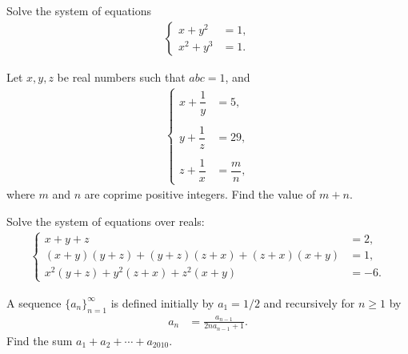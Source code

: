 \begin{question}[name={2008 Ecuador TST}]
    Solve the system of equations
    \begin{align*}
        \begin{cases}
            x+y^2 &= 1,\\ x^2+y^3 &= 1.
        \end{cases}
    \end{align*}
\end{question}



\begin{question}[name={2009 Ecuador TST}]
    Let $x,y,z$ be real numbers such that $abc=1$, and
    \begin{align*}
        \begin{cases}
            x+\dfrac{1}{y} &= 5,\\ & \\ y+\dfrac{1}{z} &= 29,\\ & \\ z+\dfrac{1}{x} &= \dfrac{m}{n},
        \end{cases}
    \end{align*}
    where $m$ and $n$ are coprime positive integers. Find the value of $m+n$.
\end{question}


\begin{question}[name={2009 Ecuador TST}]
    Solve the system of equations over reals:
    \begin{align*}
        \begin{cases}
            x+y+z &= 2,\\
            (x+y)(y+z) + (y+z)(z+x) + (z+x)(x+y) &= 1,\\
            x^2(y+z) + y^2(z+x) + z^2(x+y) &= -6.
        \end{cases}
    \end{align*}
\end{question}



\begin{question}[name={2010 Ecuador TST}]
    A sequence $\{a_n\}_{n=1}^{\infty}$ is defined initially by $a_1=1/2$ and recursively for $n\geq 1$ by
    \begin{align*}
        a_n &= \frac{a_{n-1}}{2na_{n-1}+1}.
    \end{align*}
    Find the sum $a_1+a_2+\cdots+a_{2010}$.
\end{question}



